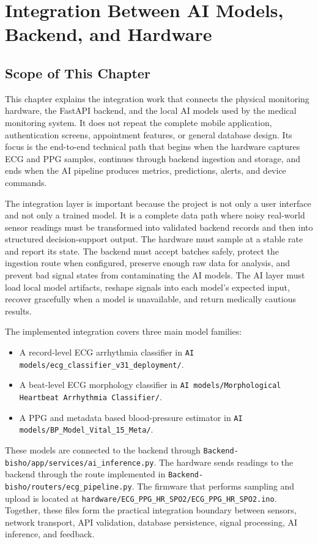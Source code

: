 \chapter{Integration Between AI Models, Backend, and Hardware}

\section{Scope of This Chapter}

This chapter explains the integration work that connects the physical monitoring hardware, the FastAPI backend, and the local AI models used by the medical monitoring system. It does not repeat the complete mobile application, authentication screens, appointment features, or general database design. Its focus is the end-to-end technical path that begins when the hardware captures ECG and PPG samples, continues through backend ingestion and storage, and ends when the AI pipeline produces metrics, predictions, alerts, and device commands.

The integration layer is important because the project is not only a user interface and not only a trained model. It is a complete data path where noisy real-world sensor readings must be transformed into validated backend records and then into structured decision-support output. The hardware must sample at a stable rate and report its state. The backend must accept batches safely, protect the ingestion route when configured, preserve enough raw data for analysis, and prevent bad signal states from contaminating the AI models. The AI layer must load local model artifacts, reshape signals into each model's expected input, recover gracefully when a model is unavailable, and return medically cautious results.

The implemented integration covers three main model families:

\begin{itemize}
    \item A record-level ECG arrhythmia classifier in \texttt{AI models/ecg\_classifier\_v31\_deployment/}.
    \item A beat-level ECG morphology classifier in \texttt{AI models/Morphological Heartbeat Arrhythmia Classifier/}.
    \item A PPG and metadata based blood-pressure estimator in \texttt{AI models/BP\_Model\_Vital\_15\_Meta/}.
\end{itemize}

These models are connected to the backend through \texttt{Backend-bisho/app/services/ai\_inference.py}. The hardware sends readings to the backend through the route implemented in \texttt{Backend-bisho/routers/ecg\_pipeline.py}. The firmware that performs sampling and upload is located at \texttt{hardware/ECG\_PPG\_HR\_SPO2/ECG\_PPG\_HR\_SPO2.ino}. Together, these files form the practical integration boundary between sensors, network transport, API validation, database persistence, signal processing, AI inference, and feedback.

